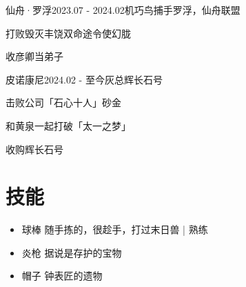\documentclass{University_resume}
\begin{document}
\begin{rSubsection}
    {仙舟·罗浮}{2023.07 - 2024.02}{机巧鸟捕手}{罗浮，仙舟联盟}
    \item 打败毁灭丰饶双命途令使幻胧
    \item 收彦卿当弟子
\end{rSubsection}

\begin{rSubsection}
    {皮诺康尼}{2024.02 - 至今}{灰总}{辉长石号}
    \item 击败公司「石心十人」砂金
    \item 和黄泉一起打破「太一之梦」
    \item 收购辉长石号
\end{rSubsection}
\section{技能}

\begin{itemize}
    \item 球棒 \hfill 随手拣的，很趁手，打过末日兽 | 熟练
    \item 炎枪 \hfill 据说是存护的宝物
    \item 帽子 \hfill 钟表匠的遗物
\end{itemize}
\end{document}
